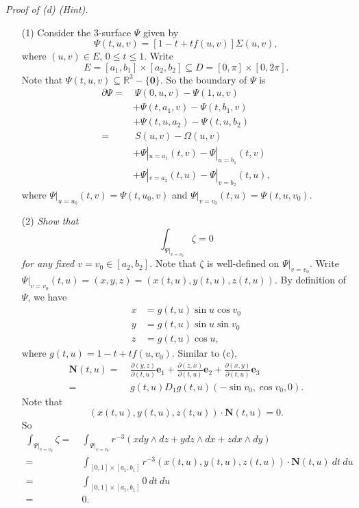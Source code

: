 \documentclass{article}
\begin{document}
\emph{Proof of (d) (Hint).}
\begin{enumerate}
\item[(1)]
  Consider the $3$-surface $\Psi$ given by
  \[
    \Psi(t,u,v) = [1-t+tf(u,v)]\Sigma(u,v),
  \]
  where $(u,v) \in E$, $0 \leq t \leq 1$.
  Write
  \[
    E = [a_1,b_1] \times [a_2,b_2] \subseteq D = [0,\pi] \times [0, 2\pi].
  \]
  Note that $\Psi(t,u,v) \subseteq \mathbb{R}^3 - \{ \mathbf{0} \}$.
  So the boundary of $\Psi$ is
  \begin{align*}
    \partial \Psi
    =& \: \Psi(0,u,v) - \Psi(1,u,v) \\
      &+ \Psi(t,a_1,v) - \Psi(t,b_1,v) \\
      &+ \Psi(t,u,a_2) - \Psi(t,u,b_2) \\
    =& \: S(u,v) - \Omega(u,v) \\
      &+ \Psi|_{u=a_1}(t,v) - \Psi|_{u=b_1}(t,v) \\
      &+ \Psi|_{v=a_2}(t,u) - \Psi|_{v=b_2}(t,u),
  \end{align*}
  where $\Psi|_{u=u_0}(t,v) = \Psi(t,u_0,v)$ and $\Psi|_{v=v_0}(t,u) = \Psi(t,u,v_0)$.

\item[(2)]
  \emph{Show that
  \[
    \int_{\Psi|_{v=v_0}} \zeta = 0
  \]
  for any fixed $v = v_0 \in [a_2, b_2]$.}
  Note that $\zeta$ is well-defined on $\Psi|_{v=v_0}$.
  Write $\Psi|_{v=v_0}(t,u) = (x,y,z) = (x(t,u),y(t,u),z(t,u))$.
  By definition of $\Psi$, we have
  \begin{align*}
    x &= g(t,u) \sin u \cos v_0 \\
    y &= g(t,u) \sin u \sin v_0 \\
    z &= g(t,u) \cos u,
  \end{align*}
  where $g(t,u) = 1-t+tf(u,v_0)$.
  Similar to (c),
  \begin{align*}
    \mathbf{N}(t,u)
    =& \: \frac{\partial(y,z)}{\partial(t,u)} \mathbf{e}_1
      + \frac{\partial(z,x)}{\partial(t,u)} \mathbf{e}_2
      + \frac{\partial(x,y)}{\partial(t,u)}\mathbf{e}_3 \\
    =& \: g(t,u) D_1 g(t,u) (-\sin v_0, \cos v_0, 0).
  \end{align*}
  Note that
  \[
    (x(t,u),y(t,u),z(t,u)) \cdot \mathbf{N}(t,u) = 0.
  \]
  So
  \begin{align*}
    \int_{\Psi|_{v=v_0}} \zeta
    =& \: \int_{\Psi|_{v=v_0}} r^{-3} (x dy \wedge dz + y dz \wedge dx + z dx \wedge dy) \\
    =& \: \int_{[0,1]\times[a_1,b_1]}
      r^{-3}(x(t,u),y(t,u),z(t,u)) \cdot \mathbf{N}(t,u) \: dt \: du \\
    =& \: \int_{[0,1]\times[a_1,b_1]} 0 \: dt \: du \\
    =& \: 0.
  \end{align*}


\end{enumerate}
\end{document}
